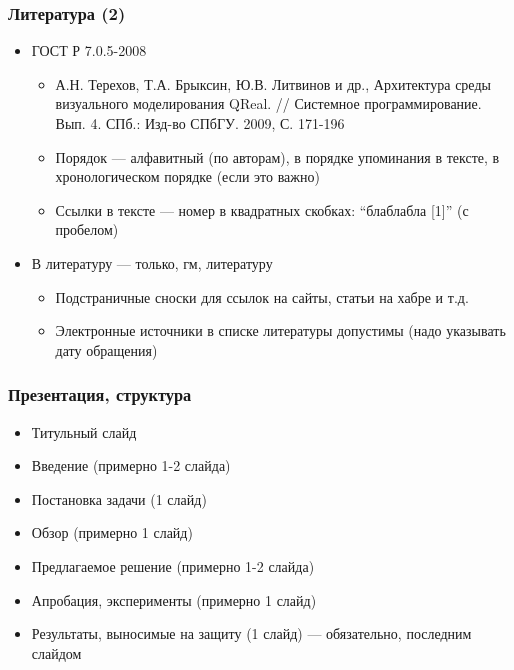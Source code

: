 \documentclass[xetex,mathserif,serif]{beamer}
\begin{document}
	\begin{frame}
		\frametitle{Литература (2)}
		\begin{itemize}
			\item ГОСТ Р 7.0.5-2008
			\begin{itemize}
				\item А.Н. Терехов, Т.А. Брыксин, Ю.В. Литвинов и др., Архитектура среды визуального моделирования QReal. // Системное программирование. Вып. 4. СПб.: Изд-во СПбГУ. 2009, С. 171-196
				\item Порядок --- алфавитный (по авторам), в порядке упоминания в тексте, в хронологическом порядке (если это важно)
				\item Ссылки в тексте --- номер в квадратных скобках: ``блаблабла [1]'' (с пробелом)
			\end{itemize}
			\item В литературу --- только, гм, литературу
			\begin{itemize}
				\item Подстраничные сноски для ссылок на сайты, статьи на хабре и т.д.
				\item Электронные источники в списке литературы допустимы (надо указывать дату обращения)
			\end{itemize}
		\end{itemize}
	\end{frame}

	\begin{frame}
		\frametitle{Презентация, структура}
		\begin{itemize}
			\item Титульный слайд
			\item Введение (примерно 1-2 слайда)
			\item Постановка задачи (1 слайд)
			\item Обзор (примерно 1 слайд)
			\item Предлагаемое решение (примерно 1-2 слайда)
			\item Апробация, эксперименты (примерно 1 слайд)
			\item Результаты, выносимые на защиту (1 слайд) --- обязательно, последним слайдом
		\end{itemize}
	\end{frame}
\end{document}
